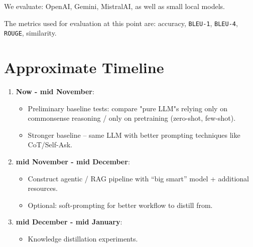 \documentclass[10pt]{article}
\begin{document}
We evaluate: OpenAI, Gemini, MistralAI, as well as small local models. %

The metrics used for evaluation at this point are: accuracy, \texttt{BLEU-1}, \texttt{BLEU-4}, \texttt{ROUGE}, similarity. 

\section{Approximate Timeline}
\begin{enumerate}
	\item \textbf{Now - mid November}: 
		\begin{itemize}
  			\item Preliminary baseline tests: compare "pure LLM"s relying only on commonsense reasoning / only on pretraining (zero-shot, few-shot).
			\item Stronger baseline – same LLM with better prompting techniques like CoT/Self-Ask.
		\end{itemize}
	\item \textbf{mid November - mid December}:
		\begin{itemize}
  			\item Construct agentic / RAG pipeline with “big smart” model + additional resources.
  			\item Optional: soft-prompting for better workflow to distill from.
		\end{itemize}
	\item \textbf{mid December - mid January}:
  		\begin{itemize}
			\item Knowledge distillation experiments.
		\end{itemize}
\end{enumerate}

\printbibliography
\end{document}
